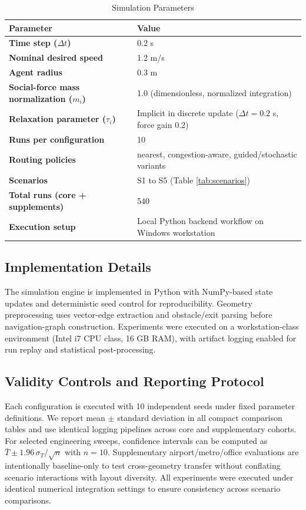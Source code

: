 \documentclass[journal]{IEEEtran}
\begin{document}
\begin{table}[t]
\centering
\caption{Simulation Parameters}
\label{tab:sim_params}
{\footnotesize
\setlength{\tabcolsep}{3pt}
\begin{tabular}{>{\bfseries}p{2.25cm} p{4.55cm}}
\toprule
Parameter & Value \\
\midrule
Time step ($\Delta t$) & 0.2 s \\
Nominal desired speed & 1.2 m/s \\
Agent radius & 0.3 m \\
Social-force mass normalization ($m_i$) & 1.0 (dimensionless, normalized integration) \\
Relaxation parameter ($\tau_i$) & Implicit in discrete update ($\Delta t=0.2$ s, force gain 0.2) \\
Runs per configuration & 10 \\
Routing policies & nearest, congestion-aware, guided/stochastic variants \\
Scenarios & S1 to S5 (Table \ref{tab:scenarios}) \\
Total runs (core + supplements) & 540 \\
Execution setup & Local Python backend workflow on Windows workstation \\
\bottomrule
\end{tabular}
}
\end{table}

\subsection{Implementation Details}
The simulation engine is implemented in Python with NumPy-based state updates and deterministic seed control for reproducibility. Geometry preprocessing uses vector-edge extraction and obstacle/exit parsing before navigation-graph construction. Experiments were executed on a workstation-class environment (Intel i7 CPU class, 16 GB RAM), with artifact logging enabled for run replay and statistical post-processing.

\subsection{Validity Controls and Reporting Protocol}
Each configuration is executed with 10 independent seeds under fixed parameter definitions. We report mean $\pm$ standard deviation in all compact comparison tables and use identical logging pipelines across core and supplementary cohorts. For selected engineering sweeps, confidence intervals can be computed as $\bar{T} \pm 1.96\,\sigma_T/\sqrt{n}$ with $n=10$. Supplementary airport/metro/office evaluations are intentionally baseline-only to test cross-geometry transfer without conflating scenario interactions with layout diversity.
All experiments were executed under identical numerical integration settings to ensure consistency across scenario comparisons.
\end{document}
